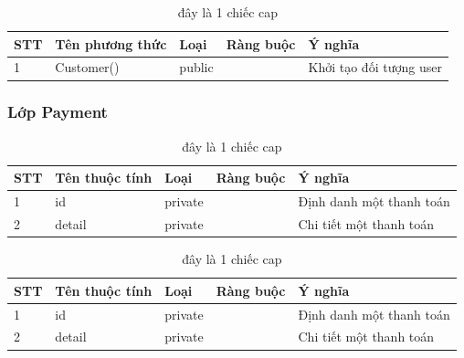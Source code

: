 \documentclass[a4paper, 12pt]{article}
\begin{document}
\begin{table}[H]
	\begin{center}
		\begin{tabular}{|l|l|l|l|l|}
			\hline
			STT & Tên phương thức          & Loại   & Ràng buộc & Ý nghĩa                                                                           \\ \hline
			1   & Customer() 				   & public &           & Khởi tạo đối tượng user \\ \hline
		\end{tabular}
		\caption{đây là 1 chiếc cap}
	\end{center}
\end{table}

\subsubsection{Lớp Payment}

\begin{table}[H]
	\begin{center}
		\begin{tabular}{|l|l|l|l|l|}
		\hline
		STT & Tên thuộc tính & Loại    & Ràng buộc & Ý nghĩa                  \\ \hline
		1   & id             & private &           & Định danh một thanh toán \\ \hline
		2   & detail         & private &           & Chi tiết một thanh toán  \\ \hline
		\end{tabular}
		\caption{đây là 1 chiếc cap}
	\end{center}
\end{table}

\begin{table}[H]
	\begin{center}
		\begin{tabular}{|l|l|l|l|l|}
		\hline
		STT & Tên thuộc tính & Loại    & Ràng buộc & Ý nghĩa                  \\ \hline
		1   & id             & private &           & Định danh một thanh toán \\ \hline
		2   & detail         & private &           & Chi tiết một thanh toán  \\ \hline
		\end{tabular}
		\caption{đây là 1 chiếc cap}
	\end{center}
\end{table}
\end{document}
